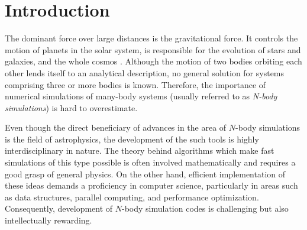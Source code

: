 \chapter{Introduction}
The dominant force over large distances is the gravitational force.
It controls the motion of planets in the solar system, is responsible for the evolution of stars and galaxies, and the whole cosmos \cite{nordtvedt2025gravity}.
Although the motion of two bodies orbiting each other lends itself to an analytical description, no general solution for systems comprising three or more bodies is known.
Therefore, the importance of numerical simulations of many-body systems (usually referred to as \textit{N-body simulations}) is hard to overestimate.

Even though the direct beneficiary of advances in the area of $N$-body simulations is the field of astrophysics, the development of the such tools is highly interdisciplinary in nature.
The theory behind algorithms which make fast simulations of this type possible is often involved mathematically and requires a good grasp of general physics.
On the other hand, efficient implementation of these ideas demands a proficiency in computer science, particularly in areas such as data structures, parallel computing, and performance optimization.
Consequently, development of $N$-body simulation codes is challenging but also intellectually rewarding.

